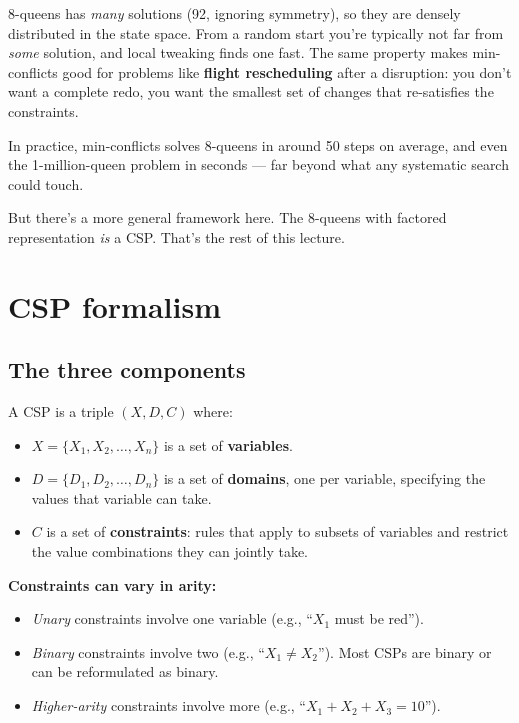 \documentclass[11pt, a4paper]{article}
\begin{document}
\begin{notebox}
8-queens has \emph{many} solutions (92, ignoring symmetry), so they are densely distributed in the state space. From a random start you're typically not far from \emph{some} solution, and local tweaking finds one fast. The same property makes min-conflicts good for problems like \textbf{flight rescheduling} after a disruption: you don't want a complete redo, you want the smallest set of changes that re-satisfies the constraints.
\end{notebox}

In practice, min-conflicts solves 8-queens in around 50 steps on average, and even the 1-million-queen problem in seconds — far beyond what any systematic search could touch.

But there's a more general framework here. The 8-queens with factored representation \emph{is} a CSP. That's the rest of this lecture.

\section{CSP formalism}

\subsection{The three components}

\begin{defbox}
A CSP is a triple $(X, D, C)$ where:
\begin{itemize}[leftmargin=*]
  \item $X = \{X_1, X_2, \dots, X_n\}$ is a set of \textbf{variables}.
  \item $D = \{D_1, D_2, \dots, D_n\}$ is a set of \textbf{domains}, one per variable, specifying the values that variable can take.
  \item $C$ is a set of \textbf{constraints}: rules that apply to subsets of variables and restrict the value combinations they can jointly take.
\end{itemize}
\end{defbox}

\textbf{Constraints can vary in arity:}
\begin{itemize}
  \item \emph{Unary} constraints involve one variable (e.g., ``$X_1$ must be red'').
  \item \emph{Binary} constraints involve two (e.g., ``$X_1 \neq X_2$''). Most CSPs are binary or can be reformulated as binary.
  \item \emph{Higher-arity} constraints involve more (e.g., ``$X_1 + X_2 + X_3 = 10$'').
\end{itemize}
\end{document}
